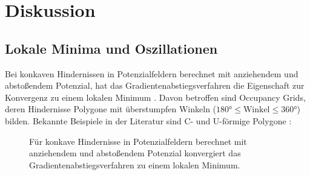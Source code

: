 \chapter{Diskussion}

\section{Lokale Minima und Oszillationen}

Bei konkaven Hindernissen in Potenzialfeldern berechnet mit anziehendem und abstoßendem Potenzial, hat das Gradientenabstiegsverfahren die Eigenschaft zur Konvergenz zu einem lokalen Minimum \cite{yujiang.2017}.
Davon betroffen sind Occupancy Grids, deren Hindernisse Polygone mit überstumpfen Winkeln ($180\text{°} \le \text{Winkel} \le 360\text{°}$) bilden.
Bekannte Beispiele in der Literatur sind C- und U-förmige Polygone \cite{maqbool.2021, yujiang.2017}:
\begin{figure}[h!]
	\centering
	\footnotesize
	\centerline{}
	\caption{Für konkave Hindernisse in Potenzialfeldern berechnet mit anziehendem und abstoßendem Potenzial konvergiert das Gradientenabstiegsverfahren zu einem lokalen Minimum.}
\end{figure}

